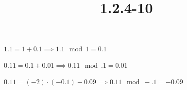 \documentclass{article}
\title{1.2.4-10}
\begin{document}
\maketitle

\( 1.1 = 1 + 0.1 \implies 1.1 \mod 1 = 0.1 \)

\( 0.11 = 0.1 + 0.01 \implies 0.11 \mod .1 = 0.01 \)

\( 0.11 = (-2)\cdot (-0.1) - 0.09 \implies 0.11 \mod -.1 = -0.09 \)
\end{document}
